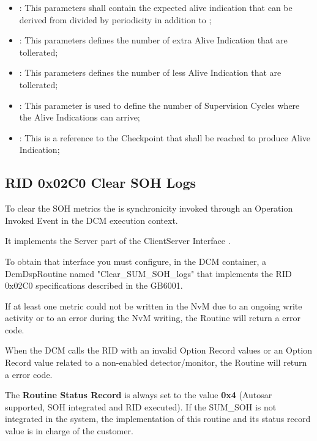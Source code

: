 \begin{itemize}
	\item \underline{}: This parameters shall contain the expected alive indication that can be derived from  divided by  periodicity in addition to ;
	\item \underline{}: This parameters defines the number of extra Alive Indication that are tollerated;
	\item \underline{}:  This parameters defines the number of less Alive Indication that are tollerated;
	\item \underline{}: This parameter is used to define the number of Supervision Cycles where the Alive Indications can arrive;
	\item \underline{}: This is a reference to the Checkpoint that shall be reached to produce Alive Indication;
\end{itemize}

\subsection{RID 0x02C0 Clear SOH Logs}\label{sec:rid02c0}
To clear the SOH metrics the  is synchronicity invoked through an Operation Invoked Event in the DCM execution context.


It implements the Server part of the ClientServer Interface . 

To obtain that interface you must configure, in the DCM container, a DcmDspRoutine named\newline
"Clear\_SUM\_SOH\_logs" that implements the RID 0x02C0 specifications described in the GB6001.

If at least one metric could not be written in the NvM due to an ongoing write activity or to an error during the NvM writing, the Routine will return a  error code.

When the DCM calls the RID with an invalid Option Record values or an Option Record value related to a non-enabled detector/monitor, the Routine will return a  error code.


The \textbf{Routine Status Record} is always set to the value \textbf{0x4} (Autosar supported, SOH integrated and RID executed). 
If the SUM\_SOH is not integrated in the system, the implementation of this routine and its status record value is in charge of the customer.

